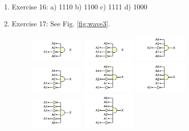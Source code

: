 \documentclass[10pt]{article}
\begin{document}
\begin{enumerate}
\item Exercise 16: a) 1110 b) 1100 c) 1111 d) 1000
\item Exercise 17: See Fig. \ref{fig:wave3}.
\begin{figure}
\centering
\includegraphics[width=0.25\textwidth]{code/hmk5_6-5-17a.pdf}
\includegraphics[width=0.25\textwidth]{code/hmk5_6-5-17b.pdf}
\includegraphics[width=0.25\textwidth]{code/hmk5_6-5-17c.pdf}
\includegraphics[width=0.25\textwidth]{code/hmk5_6-5-17d.pdf}
\includegraphics[width=0.25\textwidth]{code/hmk5_6-5-17e.pdf}
\includegraphics[width=0.25\textwidth]{code/hmk5_6-5-17f.pdf}
\includegraphics[width=0.25\textwidth]{code/hmk5_6-5-17g.pdf}
\includegraphics[width=0.25\textwidth]{code/hmk5_6-5-17h.pdf}

\end{figure}
\end{enumerate}
\end{document}
